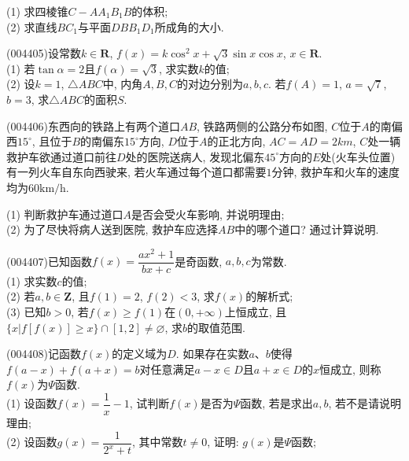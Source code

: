 (1)	求四棱锥$C-AA_1B_1B$的体积;\\
(2)	求直线$BC_1$与平面$DBB_1D_1$所成角的大小.
\item (004405)设常数$k\in \mathbf{R}$, $f(x)=k\cos^2x+\sqrt 3\sin x\cos x$, $x\in \mathbf{R}$.\\
(1) 若$\tan \alpha =2$且$f(\alpha)=\sqrt 3$, 求实数$k$的值;\\
(2) 设$k=1$, $\triangle ABC$中, 内角$A,B,C$的对边分别为$a,b,c$. 若$f(A)=1$, $a=\sqrt 7$, $b=3$, 求$\triangle ABC$的面积$S$.
\item (004406)东西向的铁路上有两个道口$AB$, 铁路两侧的公路分布如图, $C$位于$A$的南偏西$15^\circ$, 且位于$B$的南偏东$15^\circ$方向, $D$位于$A$的正北方向, $AC=AD=2km$, $C$处一辆救护车欲通过道口前往$D$处的医院送病人, 发现北偏东$45^\circ$方向的$E$处(火车头位置)有一列火车自东向西驶来, 若火车通过每个道口都需要$1$分钟, 救护车和火车的速度均为$60\text{km/h}$.
\begin{center}
\end{center}
(1) 判断救护车通过道口$A$是否会受火车影响, 并说明理由;\\
(2) 为了尽快将病人送到医院, 救护车应选择$AB$中的哪个道口? 通过计算说明.
\item (004407)已知函数$f(x)=\dfrac{ax^2+1}{bx+c}$是奇函数, $a,b,c$为常数.\\
(1)	求实数$c$的值;\\
(2)	若$a,b\in \mathbf{Z}$, 且$f(1)=2$, $f(2)<3$, 求$f(x)$的解析式;\\
(3) 已知$b>0$, 若$f(x)\ge f(1)$在$(0,+\infty)$上恒成立, 且$\{x|f[f(x)]\ge x\}\cap [1,2]\ne \varnothing$, 求$b$的取值范围.
\item (004408)记函数$f(x)$的定义域为$D$. 如果存在实数$a$、$b$使得$f(a-x)+f(a+x)=b$对任意满足$a-x\in D$且$a+x\in D$的$x$恒成立, 则称$f(x)$为$\Psi$函数.\\
(1) 设函数$f(x)=\dfrac 1x-1$, 试判断$f(x)$是否为$\Psi$函数, 若是求出$a,b$, 若不是请说明理由;\\
(2) 设函数$g(x)=\dfrac 1{2^x+t}$, 其中常数$t\ne 0$, 证明: $g(x)$是$\Psi$函数;\\
